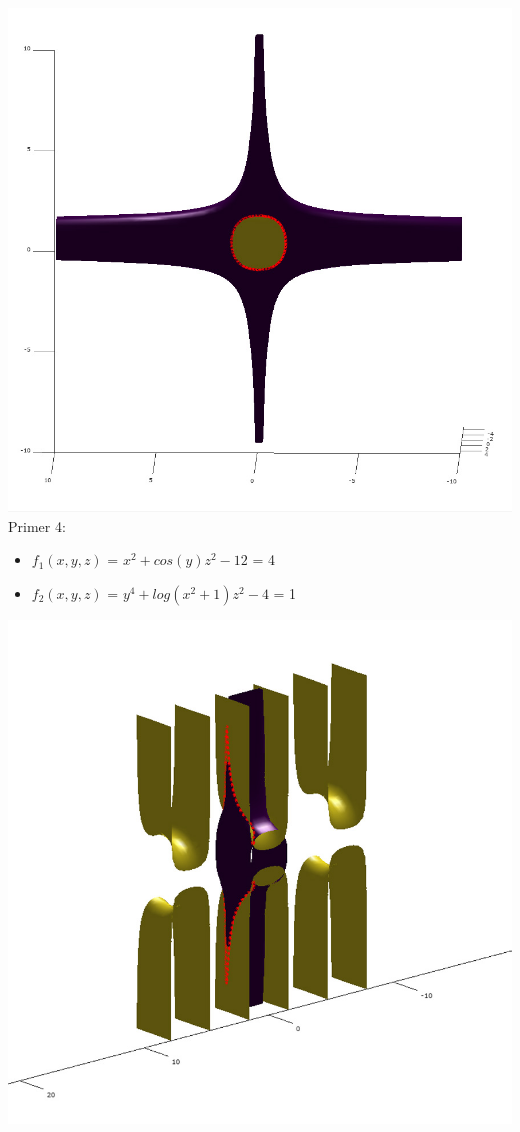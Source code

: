 \documentclass[]{article}
\begin{document}
	\includegraphics[scale=0.3]{primer3_2}
	\\
	Primer 4:
	\begin{itemize}  
		\item $f_{1}(x,y,z)$ = $x^2 + cos(y)z^2 - 12$ = 4
		\item $f_{2}(x,y,z)$ = $y^4 + log(x^2 + 1)z^2 - 4$ = 1
	\end{itemize}
	\includegraphics[scale=0.3]{primer4_1}
\end{document}
